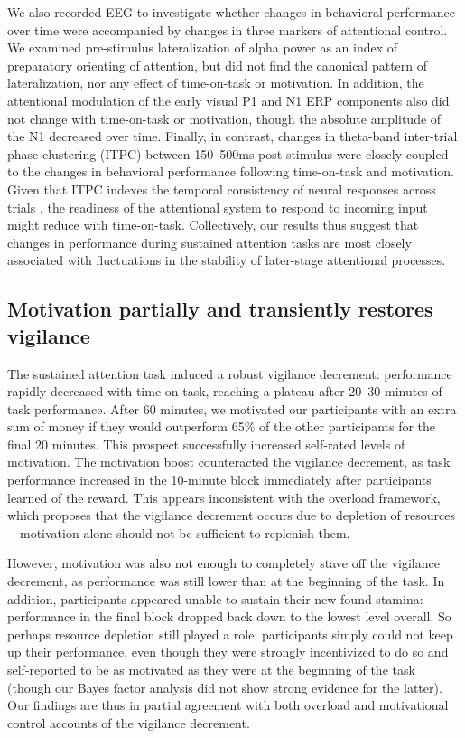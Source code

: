 \documentclass[11pt,english,]{memoir}
\begin{document}
We also recorded EEG to investigate whether changes in behavioral performance over time were accompanied by changes in three markers of attentional control. We examined pre-stimulus lateralization of alpha power as an index of preparatory orienting of attention, but did not find the canonical pattern of lateralization, nor any effect of time-on-task or motivation. In addition, the attentional modulation of the early visual P1 and N1 ERP components also did not change with time-on-task or motivation, though the absolute amplitude of the N1 decreased over time. Finally, in contrast, changes in theta-band inter-trial phase clustering (ITPC) between 150--500ms post-stimulus were closely coupled to the changes in behavioral performance following time-on-task and motivation. Given that ITPC indexes the temporal consistency of neural responses across trials \autocite{VanRullen2011}, the readiness of the attentional system to respond to incoming input might reduce with time-on-task. Collectively, our results thus suggest that changes in performance during sustained attention tasks are most closely associated with fluctuations in the stability of later-stage attentional processes.

\hypertarget{motivation-partially-and-transiently-restores-vigilance}{%
\subsection{Motivation partially and transiently restores vigilance}\label{motivation-partially-and-transiently-restores-vigilance}}

The sustained attention task induced a robust vigilance decrement: performance rapidly decreased with time-on-task, reaching a plateau after 20--30 minutes of task performance. After 60 minutes, we motivated our participants with an extra sum of money if they would outperform 65\% of the other participants for the final 20 minutes. This prospect successfully increased self-rated levels of motivation. The motivation boost counteracted the vigilance decrement, as task performance increased in the 10-minute block immediately after participants learned of the reward. This appears inconsistent with the overload framework, which proposes that the vigilance decrement occurs due to depletion of resources---motivation alone should not be sufficient to replenish them.

However, motivation was also not enough to completely stave off the vigilance decrement, as performance was still lower than at the beginning of the task. In addition, participants appeared unable to sustain their new-found stamina: performance in the final block dropped back down to the lowest level overall. So perhaps resource depletion still played a role: participants simply could not keep up their performance, even though they were strongly incentivized to do so and self-reported to be as motivated as they were at the beginning of the task (though our Bayes factor analysis did not show strong evidence for the latter). Our findings are thus in partial agreement with both overload and motivational control accounts of the vigilance decrement.
\end{document}
